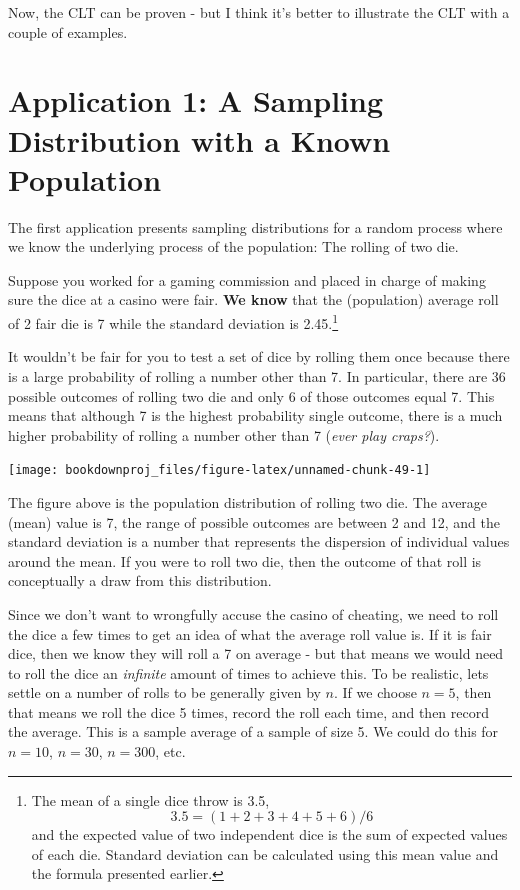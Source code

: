 \documentclass[
]{book}
\begin{document}
Now, the CLT can be proven - but I think it's better to illustrate the CLT with a couple of examples.

\hypertarget{application-1-a-sampling-distribution-with-a-known-population}{%
\section{Application 1: A Sampling Distribution with a Known Population}\label{application-1-a-sampling-distribution-with-a-known-population}}

The first application presents sampling distributions for a random process where we know the underlying process of the population: The rolling of two die.

Suppose you worked for a gaming commission and placed in charge of making sure the dice at a casino were fair. \textbf{We know} that the (population) average roll of 2 fair die is 7 while the standard deviation is 2.45.\footnote{The mean of a single dice throw is 3.5,
  \[ 3.5 = (1 + 2 + 3 + 4 + 5 + 6) / 6\]
  and the expected value of two independent dice is the sum of expected values of each die. Standard deviation can be calculated using this mean value and the formula presented earlier.}

It wouldn't be fair for you to test a set of dice by rolling them once because there is a large probability of rolling a number other than 7. In particular, there are 36 possible outcomes of rolling two die and only 6 of those outcomes equal 7. This means that although 7 is the highest probability single outcome, there is a much higher probability of rolling a number other than 7 (\emph{ever play craps?}).

\begin{center}\texttt{[image: bookdownproj\_files/figure-latex/unnamed-chunk-49-1]} \end{center}

The figure above is the population distribution of rolling two die. The average (mean) value is 7, the range of possible outcomes are between 2 and 12, and the standard deviation is a number that represents the dispersion of individual values around the mean. If you were to roll two die, then the outcome of that roll is conceptually a draw from this distribution.

Since we don't want to wrongfully accuse the casino of cheating, we need to roll the dice a few times to get an idea of what the average roll value is. If it is fair dice, then we know they will roll a 7 on average - but that means we would need to roll the dice an \emph{infinite} amount of times to achieve this. To be realistic, lets settle on a number of rolls to be generally given by \(n\). If we choose \(n=5\), then that means we roll the dice 5 times, record the roll each time, and then record the average. This is a sample average of a sample of size 5. We could do this for \(n=10\), \(n=30\), \(n=300\), etc.
\end{document}
